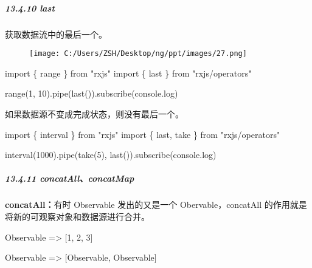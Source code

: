 \documentclass[
]{article}
\newenvironment{Shaded}{}{}
\newcommand{\BuiltInTok}[1]{#1}
\newcommand{\DecValTok}[1]{\textcolor[rgb]{0.25,0.63,0.44}{#1}}
\newcommand{\FunctionTok}[1]{\textcolor[rgb]{0.02,0.16,0.49}{#1}}
\newcommand{\ImportTok}[1]{#1}
\newcommand{\NormalTok}[1]{#1}
\newcommand{\OperatorTok}[1]{\textcolor[rgb]{0.40,0.40,0.40}{#1}}
\newcommand{\StringTok}[1]{\textcolor[rgb]{0.25,0.44,0.63}{#1}}
\begin{document}
\hypertarget{13410-last}{%
\subparagraph{13.4.10 last}\label{13410-last}}

获取数据流中的最后一个。

\begin{figure}
\centering
\texttt{[image: C:/Users/ZSH/Desktop/ng/ppt/images/27.png]}
\caption{}
\end{figure}

\begin{Shaded}
\begin{Highlighting}[]
\ImportTok{import}\NormalTok{ \{ range \} }\ImportTok{from} \StringTok{"rxjs"}
\ImportTok{import}\NormalTok{ \{ last \} }\ImportTok{from} \StringTok{"rxjs/operators"}

\FunctionTok{range}\NormalTok{(}\DecValTok{1}\OperatorTok{,} \DecValTok{10}\NormalTok{)}\OperatorTok{.}\FunctionTok{pipe}\NormalTok{(}\FunctionTok{last}\NormalTok{())}\OperatorTok{.}\FunctionTok{subscribe}\NormalTok{(}\BuiltInTok{console}\OperatorTok{.}\FunctionTok{log}\NormalTok{)}
\end{Highlighting}
\end{Shaded}

如果数据源不变成完成状态，则没有最后一个。

\begin{Shaded}
\begin{Highlighting}[]
\ImportTok{import}\NormalTok{ \{ interval \} }\ImportTok{from} \StringTok{"rxjs"}
\ImportTok{import}\NormalTok{ \{ last}\OperatorTok{,}\NormalTok{ take \} }\ImportTok{from} \StringTok{"rxjs/operators"}

\FunctionTok{interval}\NormalTok{(}\DecValTok{1000}\NormalTok{)}\OperatorTok{.}\FunctionTok{pipe}\NormalTok{(}\FunctionTok{take}\NormalTok{(}\DecValTok{5}\NormalTok{)}\OperatorTok{,} \FunctionTok{last}\NormalTok{())}\OperatorTok{.}\FunctionTok{subscribe}\NormalTok{(}\BuiltInTok{console}\OperatorTok{.}\FunctionTok{log}\NormalTok{)}
\end{Highlighting}
\end{Shaded}

\hypertarget{13411-concatallconcatmap}{%
\subparagraph{13.4.11
concatAll、concatMap}\label{13411-concatallconcatmap}}

\textbf{concatAll：}有时 Observable 发出的又是一个 Obervable，concatAll
的作用就是将新的可观察对象和数据源进行合并。

Observable =\textgreater{} {[}1, 2, 3{]}

Observable =\textgreater{} {[}Observable, Observable{]}
\end{document}
